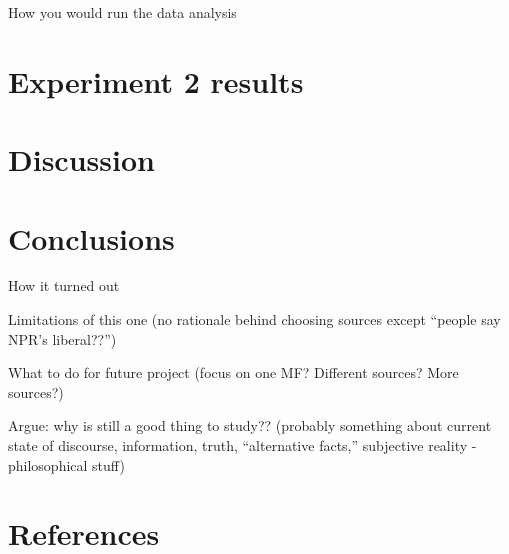 \documentclass[,man]{apa6}
\theoremstyle{definition}
\theoremstyle{definition}
\theoremstyle{definition}
\theoremstyle{remark}
\begin{document}
How you would run the data analysis

\hypertarget{experiment-2-results}{%
\section{Experiment 2 results}\label{experiment-2-results}}

\hypertarget{discussion-1}{%
\section{Discussion}\label{discussion-1}}

\hypertarget{conclusions}{%
\section{Conclusions}\label{conclusions}}

How it turned out

Limitations of this one (no rationale behind choosing sources except
\enquote{people say NPR's liberal??})

What to do for future project (focus on one MF? Different sources? More
sources?)

Argue: why is still a good thing to study?? (probably something about
current state of discourse, information, truth, \enquote{alternative
facts,} subjective reality - philosophical stuff)

\newpage

\hypertarget{references}{%
\section{References}\label{references}}

\begingroup
\setlength{\parindent}{-0.5in}
\setlength{\leftskip}{0.5in}

\hypertarget{refs}{}

\endgroup
\end{document}
